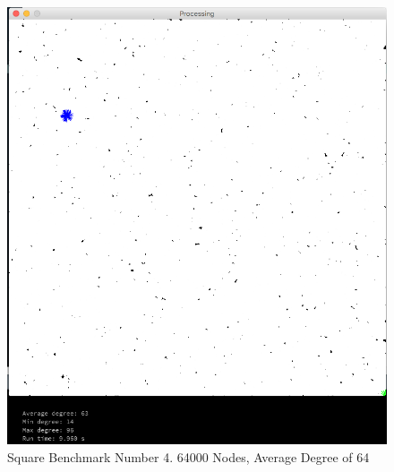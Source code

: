 \documentclass{article}
\begin{document}
\begin{center}
    \begin{figure}
        \includegraphics[scale=0.45]{./images/square_3.png}
        \caption{Square Benchmark Number 4. 64000 Nodes, Average Degree of 64}
        \label{square3}
    \end{figure}
\end{center}
\end{document}
